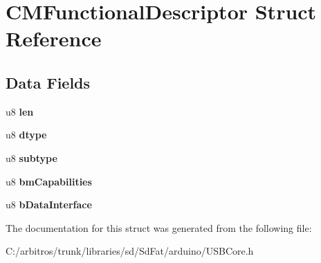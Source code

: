 \hypertarget{struct_c_m_functional_descriptor}{\section{C\-M\-Functional\-Descriptor Struct Reference}
\label{struct_c_m_functional_descriptor}
}
\subsection*{Data Fields}
\begin{DoxyCompactItemize}
\item 
\hypertarget{struct_c_m_functional_descriptor_afbf3f3230446569534d5f466aaf4c23b}{u8 {\bfseries len}}\label{struct_c_m_functional_descriptor_afbf3f3230446569534d5f466aaf4c23b}

\item 
\hypertarget{struct_c_m_functional_descriptor_a0bb419531ec75697e63e9109fecf81b0}{u8 {\bfseries dtype}}\label{struct_c_m_functional_descriptor_a0bb419531ec75697e63e9109fecf81b0}

\item 
\hypertarget{struct_c_m_functional_descriptor_afb82dd1313bc5284e4e5aef8218ef414}{u8 {\bfseries subtype}}\label{struct_c_m_functional_descriptor_afb82dd1313bc5284e4e5aef8218ef414}

\item 
\hypertarget{struct_c_m_functional_descriptor_a9ad7ca27543639baeed1b53c6f24e149}{u8 {\bfseries bm\-Capabilities}}\label{struct_c_m_functional_descriptor_a9ad7ca27543639baeed1b53c6f24e149}

\item 
\hypertarget{struct_c_m_functional_descriptor_a856be28e5decda9135c9b148a4897716}{u8 {\bfseries b\-Data\-Interface}}\label{struct_c_m_functional_descriptor_a856be28e5decda9135c9b148a4897716}

\end{DoxyCompactItemize}


The documentation for this struct was generated from the following file\-:\begin{DoxyCompactItemize}
\item 
C\-:/arbitros/trunk/libraries/sd/\-Sd\-Fat/arduino/U\-S\-B\-Core.\-h\end{DoxyCompactItemize}
